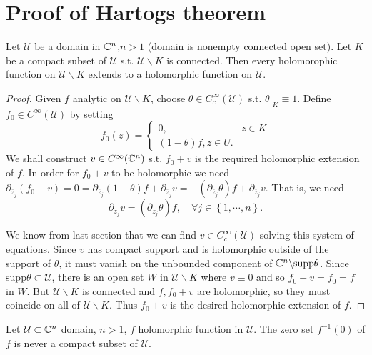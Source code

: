 \section{Proof of Hartogs theorem}
\begin{theorem}
  Let $\mathcal{U}$ be a domain in $\mathbb{C}^{n}$,$n>1$ (domain is nonempty connected open set). Let $K$ be a compact subset of $\mathcal{U}$ s.t. $\mathcal{U}\backslash K$ is connected. Then every holomorophic function on $\mathcal{U}\backslash  K$ extends to a holomorphic function on $\mathcal{U}$.
\end{theorem}
\begin{proof}
  Given $f$ analytic on $\mathcal{U}\backslash  K$, choose $\theta \in  C_c^{\infty}(\mathcal{U})$ s.t. $\theta|_K\equiv 1$. Define $f_0\in C^{\infty}\left( \mathcal{U} \right) $ by setting 
  \[
    f_0(z)=\begin{cases}
      0,&z\in K\\
      (1-\theta)f, z \in U.
    \end{cases}
  \]
  We shall construct $v \in C^{\infty}(\mathbb{C}^{n})$ s.t.  $f_0+v$ is the required holomorphic extension of $f$. In order for $f_0+v$ to be holomorphic we need $\partial_{\overline{z}_j}(f_0+v)=0=\partial_{\overline{z}_j}(1-\theta)f+\partial_{\overline{z}_j}v=-(\partial_{\overline{z}_j}\theta )f+\partial_{\overline{z}_j}v$. That is, we need 
  \[
    \partial_{\overline{z}_j}v=\left( \partial_{\overline{z}_j}\theta \right) f,\quad \forall j\in \left\{1,\cdots ,n\right\} .
  \]

  We know from last section that we can find $v\in C_c^{\infty}(\mathcal{U})$ solving this system of equations.
  Since $v$ has compact support and is holomorphic outside of the support of $\theta$, it must vanish on the unbounded component of $\mathbb{C}^{n}\backslash \mathrm{supp}\theta$. Since $\mathrm{supp}\theta\subset \mathcal{U}$, there is an open set $W$ in $\mathcal{U}\backslash  K$ where $v\equiv 0$ and so $f_0+v= f_0=f$ in $W$. But $\mathcal{U}\backslash K$ is connected and $f,f_0+v$ are holomorphic, so they must coincide on all of $\mathcal{U}\backslash K$. Thus $f_0+v$ is the desired holomorphic extension of $f$.
\end{proof}
\begin{corollary}
  Let $\mathcal{U}\subset \mathbb{C}^{n}$ domain, $n>1$, $f$ holomorphic function in $\mathcal{U}$. The zero set $f^{-1}(0)$ of $f$ is never a compact subset of $\mathcal{U}$.
\end{corollary}
